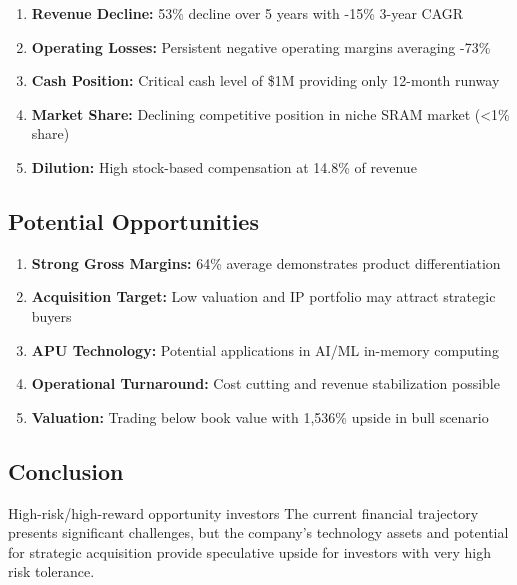 \documentclass[11pt,a4paper]{article}
\begin{document}
\begin{enumerate}
\itemsep0.3em
\item \textbf{Revenue Decline:} 53\% decline over 5 years with -15\% 3-year CAGR
\item \textbf{Operating Losses:} Persistent negative operating margins averaging -73\%
\item \textbf{Cash Position:} Critical cash level of \$1M providing only 12-month runway
\item \textbf{Market Share:} Declining competitive position in niche SRAM market (<1\% share)
\item \textbf{Dilution:} High stock-based compensation at 14.8\% of revenue
\end{enumerate}

\vspace{0.3cm}

\subsection{Potential Opportunities}

\begin{enumerate}
\itemsep0.3em
\item \textbf{Strong Gross Margins:} 64\% average demonstrates product differentiation
\item \textbf{Acquisition Target:} Low valuation and IP portfolio may attract strategic buyers
\item \textbf{APU Technology:} Potential applications in AI/ML in-memory computing
\item \textbf{Operational Turnaround:} Cost cutting and revenue stabilization possible
\item \textbf{Valuation:} Trading below book value with 1,536\% upside in bull scenario
\end{enumerate}

\vspace{0.3cm}

\subsection{Conclusion}

\noindent High-risk/high-reward opportunity investors The current financial trajectory presents significant challenges, but the company's technology assets and potential for strategic acquisition provide speculative upside for investors with very high risk tolerance.
\end{document}
